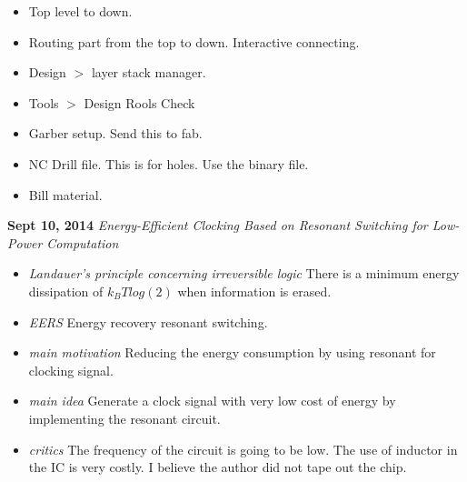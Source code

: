 \documentclass[]{article}
\begin{document}
\begin{itemize}
            \item   Top level to down. 
            \item   Routing part from the top to down. Interactive connecting.
            \item   Design $>$ layer stack manager.
            \item   Tools $>$ Design Rools Check
            \item   Garber setup. Send this to fab.
            \item   NC Drill file. This is for holes. Use the binary file.
            \item   Bill material.

            \end{itemize}

\noindent \textbf{ Sept 10, 2014}
\textit{Energy-Efficient Clocking Based on Resonant Switching for Low-Power Computation}
\indent		\begin{itemize}

            \item \textit{Landauer's principle concerning irreversible logic} There is a minimum energy dissipation of $k_{B}Tlog(2)$ when information is erased.
            \item \textit{EERS} Energy recovery resonant switching.    
        
            \item \textit{main motivation} Reducing the energy consumption by using resonant for clocking signal.

            \item \textit{main idea} Generate a clock signal with very low cost of energy by implementing the resonant circuit. 

            \item \textit {critics} The frequency of the circuit is going to be low.
            The use of inductor in the IC is very costly. I believe the author did not tape out the chip.

            \end{itemize}
\end{document}
